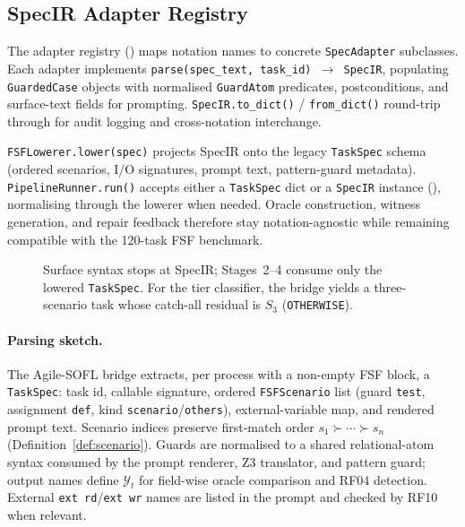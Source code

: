 \subsection{SpecIR Adapter Registry}
\label{sec:impl:specir-adapters}

The adapter registry () maps notation names to
concrete \texttt{SpecAdapter} subclasses.
Each adapter implements \texttt{parse(spec\_text, task\_id) $\to$ SpecIR},
populating \texttt{GuardedCase} objects with normalised \texttt{GuardAtom}
predicates, postconditions, and surface-text fields for prompting.
\texttt{SpecIR.to\_dict()} / \texttt{from\_dict()} round-trip through
 for audit logging and cross-notation
interchange.

\texttt{FSFLowerer.lower(spec)} projects SpecIR onto the legacy
\texttt{TaskSpec} schema (ordered scenarios, I/O signatures, prompt text,
pattern-guard metadata).
\texttt{PipelineRunner.run()} accepts either a \texttt{TaskSpec} dict or a
\texttt{SpecIR} instance (), normalising
through the lowerer when needed.
Oracle construction, witness generation, and repair feedback therefore stay
notation-agnostic while remaining compatible with the 120-task FSF benchmark.

\begin{figure}[t]
  \centering
  \caption{Surface syntax stops at SpecIR; Stages~2--4 consume only the
           lowered \texttt{TaskSpec}.
           For the tier classifier, the bridge yields a three-scenario task
           whose catch-all residual is $S_3$ (\texttt{OTHERWISE}).}
  \label{fig:fsf-parser-class}
\end{figure}

\paragraph{Parsing sketch.}
The Agile-SOFL bridge extracts, per process with a non-empty FSF block, a
\texttt{TaskSpec}: task id, callable signature, ordered
\texttt{FSFScenario} list (guard \texttt{test}, assignment \texttt{def},
kind \texttt{scenario}/\texttt{others}), external-variable map, and rendered
prompt text.
Scenario indices preserve first-match order
$s_1 \succ \cdots \succ s_n$~\citep{dijkstra1975guarded}
(Definition~\ref{def:scenario}).
Guards are normalised to a shared relational-atom syntax consumed by the
prompt renderer, Z3 translator, and pattern guard; output names define
$\mathcal{Y}_t$ for field-wise oracle comparison and RF04 detection.
External \texttt{ext rd}/\texttt{ext wr} names are listed in the prompt and
checked by RF10 when relevant.

